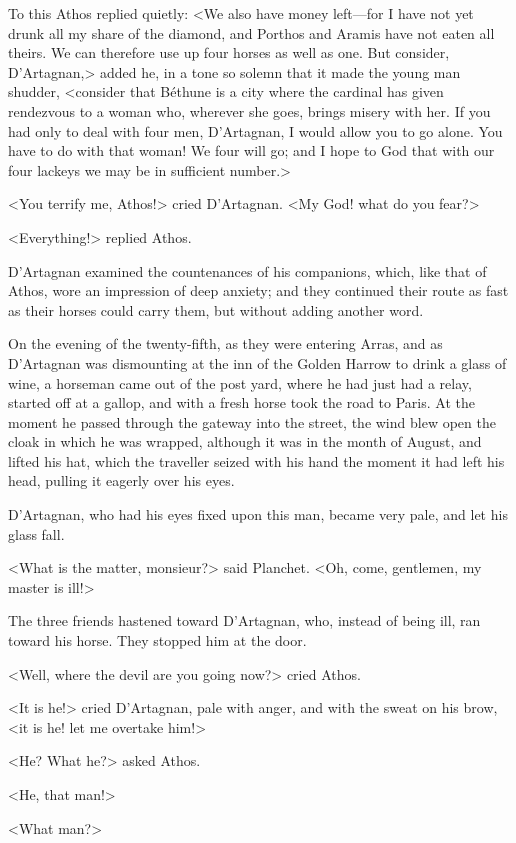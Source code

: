 To this Athos replied quietly: <We also have money left—for I have not yet drunk all my share of the diamond, and Porthos and Aramis have not eaten all theirs. We can therefore use up four horses as well as one. But consider, D'Artagnan,> added he, in a tone so solemn that it made the young man shudder, <consider that Béthune is a city where the cardinal has given rendezvous to a woman who, wherever she goes, brings misery with her. If you had only to deal with four men, D'Artagnan, I would allow you to go alone. You have to do with that woman! We four will go; and I hope to God that with our four lackeys we may be in sufficient number.> 

<You terrify me, Athos!> cried D'Artagnan. <My God! what do you fear?> 

<Everything!> replied Athos. 

D'Artagnan examined the countenances of his companions, which, like that of Athos, wore an impression of deep anxiety; and they continued their route as fast as their horses could carry them, but without adding another word. 

On the evening of the twenty-fifth, as they were entering Arras, and as D'Artagnan was dismounting at the inn of the Golden Harrow to drink a glass of wine, a horseman came out of the post yard, where he had just had a relay, started off at a gallop, and with a fresh horse took the road to Paris. At the moment he passed through the gateway into the street, the wind blew open the cloak in which he was wrapped, although it was in the month of August, and lifted his hat, which the traveller seized with his hand the moment it had left his head, pulling it eagerly over his eyes. 

D'Artagnan, who had his eyes fixed upon this man, became very pale, and let his glass fall. 

<What is the matter, monsieur?> said Planchet. <Oh, come, gentlemen, my master is ill!> 

The three friends hastened toward D'Artagnan, who, instead of being ill, ran toward his horse. They stopped him at the door. 

<Well, where the devil are you going now?> cried Athos. 

<It is he!> cried D'Artagnan, pale with anger, and with the sweat on his brow, <it is he! let me overtake him!> 

<He? What he?> asked Athos. 

<He, that man!> 

<What man?> 

